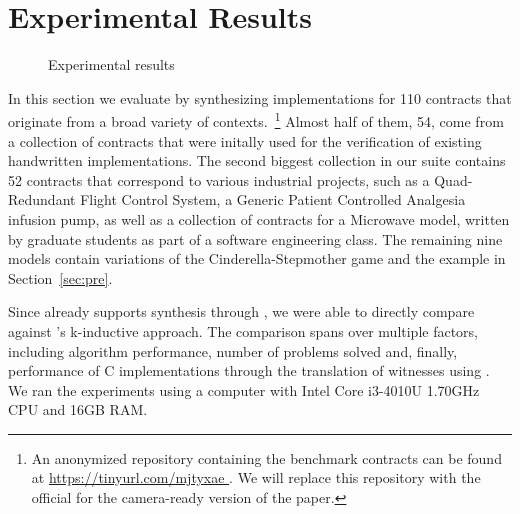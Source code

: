 \section{Experimental Results}
\label{sec:results}

\begin{figure}[!t]
\centering
{}


\caption{Experimental results}
\label{fg:results}
\end{figure}

In this section we evaluate \jsynvg by synthesizing implementations
for 110 contracts that originate from a broad variety of contexts.~\footnote{An
anonymized repository containing the benchmark contracts can be found at
\url{https://tinyurl.com/mjtyxae }. We will replace this repository with the official for the camera-ready
version of the paper.} Almost half of them, 54, come from a collection of contracts that were initally used for the verification of existing handwritten implementations. The second biggest collection in our suite contains 52 contracts that correspond to various industrial projects, such as a Quad-Redundant Flight Control System, a Generic Patient Controlled Analgesia infusion pump, as well as a collection of contracts
for a Microwave model, written by graduate students as part of a software
engineering class. The remaining nine models contain variations of the
Cinderella-Stepmother game and the example in Section~\ref{sec:pre}.

Since \jkind already supports synthesis through \jsyn, we were able to directly
compare \jsynvg against \jsyn's k-inductive approach.
The comparison spans over multiple factors, including
algorithm performance, number of problems solved and, finally, performance
of C implementations through the translation of witnesses using \smtlibtoc. We
ran the experiments using a computer with Intel Core i3-4010U 1.70GHz CPU and
16GB RAM.


